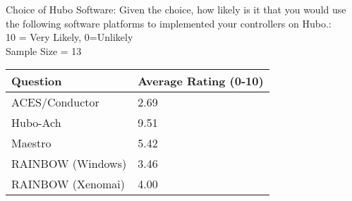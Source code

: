 \begin{table}
\centering
\caption{Q5: Survey on the Unified Algorithmic Framework for Complex System and Humanoids, Hubo-Ach:}\label{table:q5}
Choice of Hubo Software: Given the choice, how likely is it that you would use the following software platforms to implemented your controllers on Hubo.:\\
\small
10 = Very Likely, 0=Unlikely\\
Sample Size = 13\\
\normalsize
\begin{longtable}{|p{9cm} | p{3cm} | }
\hline
Question		&	Average Rating (0-10)	\\	\hline
\hline
\hline
ACES/Conductor		& 	2.69 \\
\hline
Hubo-Ach		&	9.51 \\
\hline
Maestro			& 	5.42 \\
\hline
RAINBOW (Windows)	&	3.46 \\
\hline
RAINBOW (Xenomai)	&	4.00 \\
\hline


\end{longtable}
\end{table}

